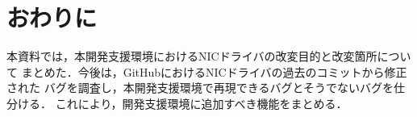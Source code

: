 \documentclass[12pt]{jsarticle}
\begin{document}
\section{おわりに}
本資料では，本開発支援環境におけるNICドライバの改変目的と改変箇所について
まとめた．今後は，GitHubにおけるNICドライバの過去のコミットから修正された
バグを調査し，本開発支援環境で再現できるバグとそうでないバグを仕分ける．
これにより，開発支援環境に追加すべき機能をまとめる．
\end{document}
